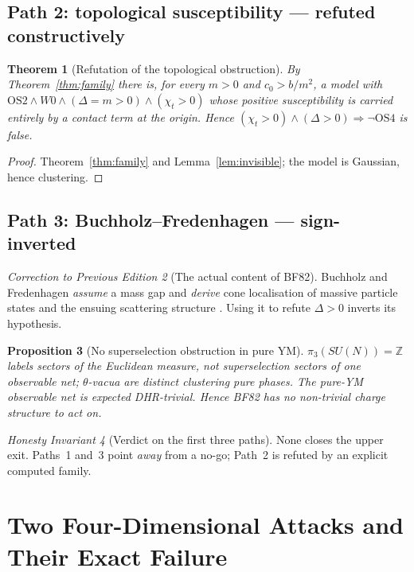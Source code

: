 \documentclass[11pt,a4paper]{article}
\theoremstyle{plain}
\newtheorem{theorem}{Theorem}[section]
\newtheorem{proposition}[theorem]{Proposition}
\theoremstyle{definition}
\theoremstyle{remark}
\newtheorem{invariant}[theorem]{Honesty Invariant}
\newtheorem{correction}[theorem]{Correction to Previous Edition}
\newcommand{\Z}{\mathbb{Z}}\newcommand{\Spec}{\operatorname{Spec}}
\newcommand{\OS}{\mathrm{OS}}\newcommand{\Gap}{\mathrm{Gap}}
\newcommand{\Chit}{\chi_t}
\renewcommand{\_}{\oldunderscore\allowbreak}
\begin{document}
\subsection{Path 2: topological susceptibility --- refuted constructively}
\begin{theorem}[Refutation of the topological obstruction]\label{cor:path2}
By Theorem~\ref{thm:family} there is, for every $m>0$ and $c_0>b/m^2$, a model with
$\OS2\wedge W0\wedge(\Delta=m>0)\wedge(\Chit>0)$ whose positive susceptibility is carried
entirely by a contact term at the origin. Hence
$(\Chit>0)\wedge(\Delta>0)\Rightarrow\neg\OS4$ is \emph{false}.
\end{theorem}
\begin{proof}
Theorem~\ref{thm:family} and Lemma~\ref{lem:invisible}; the model is Gaussian, hence clustering.
\end{proof}
\subsection{Path 3: Buchholz--Fredenhagen --- sign-inverted}
\begin{correction}[The actual content of BF82]\label{corr:bf}
Buchholz and Fredenhagen \cite{BF1982} \emph{assume} a mass gap and \emph{derive} cone
localisation of massive particle states and the ensuing scattering structure
\cite{Haag1992,RehrenSLQFT}. Using it to refute $\Delta>0$ inverts its hypothesis.
\end{correction}
\begin{proposition}[No superselection obstruction in pure YM]\label{prop:path3}
$\pi_3(SU(N))=\Z$ labels sectors of the \emph{Euclidean measure}, not superselection sectors of
one observable net; $\theta$-vacua are distinct clustering pure phases. The pure-YM observable
net is expected DHR-trivial. Hence BF82 has no non-trivial charge structure to act on.
\end{proposition}
\begin{invariant}[Verdict on the first three paths]\label{inv:upper}
None closes the upper exit. Paths~1 and~3 point \emph{away} from a no-go; Path~2 is refuted by an
explicit computed family.
\end{invariant}
\section{Two Four-Dimensional Attacks and Their Exact Failure}\label{sec:attacks}
\end{document}

